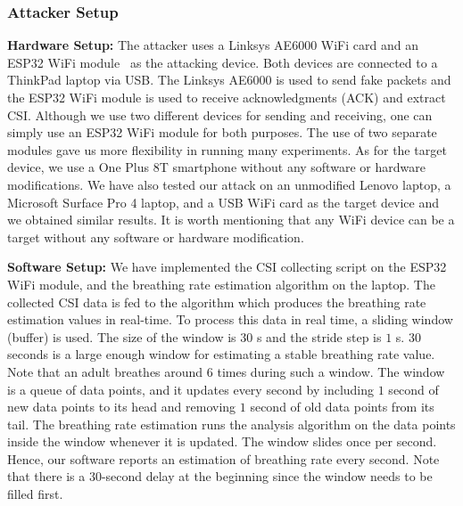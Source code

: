 \subsubsection{Attacker Setup}
\noindent\textbf{Hardware Setup:}
The attacker uses a Linksys AE6000 WiFi card and an ESP32 WiFi module~\cite{esp32} as the attacking device. Both devices are connected to a ThinkPad laptop via USB. The Linksys AE6000 is used to send fake packets and the ESP32 WiFi module is used to receive acknowledgments (ACK) and extract CSI. Although we use two different devices for sending and receiving, one can simply use an ESP32 WiFi module for both purposes. The use of two separate modules gave us more flexibility in running many experiments. As for the target device, we use a One Plus 8T smartphone without any software or hardware modifications. We have also tested our attack on an unmodified Lenovo laptop, a Microsoft Surface Pro 4 laptop, and a USB WiFi card as the target device and we obtained similar results. It is worth mentioning that any WiFi device can be a target without any software or hardware modification. 

\vspace{0.05in}
\noindent\textbf{Software Setup:}
We have implemented the CSI collecting script on the ESP32 WiFi module, and the breathing rate estimation algorithm on the laptop. The collected CSI data is fed to the algorithm which produces the breathing rate estimation values in real-time.  To process this data in real time, a sliding window (buffer) is used. The size of the window is $30$ s and the stride step is $1$ s. 
$30$ seconds is a large enough window for estimating a stable breathing rate value. Note that an adult breathes around 6 times during such a window. The window is a queue of data points, and it updates every second by including $1$ second of new data points to its head and removing $1$ second of old data points from its tail. The breathing rate estimation runs the analysis algorithm on the data points inside the window whenever it is updated. The window slides once per second. Hence, our software reports an estimation of breathing rate every second. Note that there is a $30$-second delay at the beginning since the window needs to be filled first.


